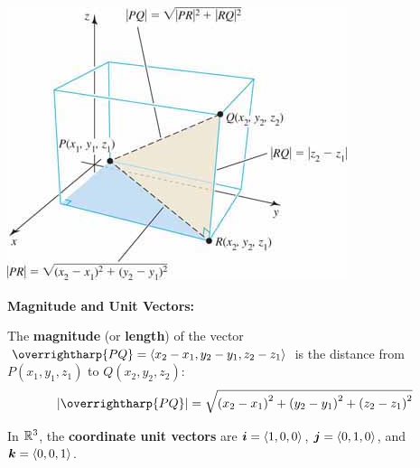 \documentclass[mathNotesPreamble]{subfiles}
\begin{document}
    \begin{center}
      \includegraphics[width=0.5\linewidth]{images/briggs_13_02/fig13_32}
    \end{center}
    \pagebreak

    \textbf{Magnitude and Unit Vectors:}
  \begin{defn*}
    The \textbf{magnitude} (or \textbf{length}) of the vector $\overrightharp{PQ}=\bracket{x_2-x_1,y_2-y_1,z_2-z_1}$ is the distance from $P(x_1,y_1,z_1)$ to $Q(x_2,y_2,z_2)$:
      \[\abs{\overrightharp{PQ}}=\sqrt{\parens{x_2-x_1}^2+\parens{y_2-y_1}^2+\parens{z_2-z_1}^2}\]
  \end{defn*}
  \noindent
  In $\mathbb{R}^3$, the \textbf{coordinate unit vectors} are ${\bm{i}}={\left\langle 1,0,0 \right\rangle}$, ${\bm{j}}={\left\langle 0,1,0 \right\rangle}$, and ${\bm{k}}={\left\langle 0,0,1 \right\rangle}$.
\end{document}
